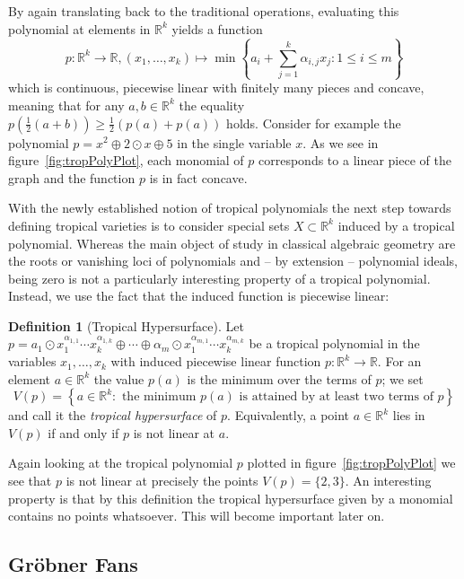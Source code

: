 \documentclass[
  paper=a4,
  DIV=14,
  fontsize=12pt,
  titlepage,
  bibliography=totoc,
  listof=totoc,
  pagesize=pdftex
]{scrartcl}
\numberwithin{figure}{section}
\numberwithin{equation}{section}
\numberwithin{table}{section}
\newcommand*\setR{\mathds{R}}
\theoremstyle{definition}
\newtheorem{definition}{Definition}
\numberwithin{definition}{section}
\begin{document}
By again translating back to the traditional operations, evaluating this polynomial at
elements in $\setR^k$ yields a function
\[
  p : \setR^k \to \setR, (x_1, \dots, x_k) \mapsto
  \min\left\{
    a_i + \sum_{j=1}^k \alpha_{i,j}x_j : 1 \leq i \leq m
  \right\}
\]
which is continuous, piecewise linear with finitely many pieces and concave, meaning that
for any $a,b \in \setR^k$ the equality $p(\frac12(a+b)) \geq \frac12(p(a)+p(a))$ holds.
Consider for example the polynomial $p = x^2 \oplus 2\odot x \oplus 5$ in the single
variable $x$. As we see in figure~\ref{fig:tropPolyPlot}, each monomial of $p$ corresponds
to a linear piece of the graph and the function $p$ is in fact concave.

With the newly established notion of tropical polynomials the next step towards defining
tropical varieties is to consider special sets $X \subset \setR^k$ induced by a tropical
polynomial. Whereas the main object of study in classical algebraic geometry are the
roots or vanishing loci of polynomials and -- by extension -- polynomial ideals, being
zero is not a particularly interesting property of a tropical polynomial. Instead, we use
the fact that the induced function is piecewise linear:

\begin{definition}[Tropical Hypersurface]
  Let $p = a_1 \odot x_1^{\alpha_{1,1}}\cdots x_k^{\alpha_{1,k}} \oplus \cdots \oplus
  \alpha_m \odot x_1^{\alpha_{m,1}}\cdots x_k^{\alpha_{m,k}}$ be a tropical polynomial in the
  variables $x_1, \dots, x_k$ with induced piecewise linear function $p:\setR^k \to
  \setR$. For an element $a\in \setR^k$ the value $p(a)$ is the minimum over the terms of
  $p$; we set
  \[
    V(p) = \left\{
      a \in \setR^k :
      \text{ the minimum $p(a)$ is attained by at least two terms of $p$}
    \right\}
  \]
  and call it the \emph{tropical hypersurface} of $p$. Equivalently, a point $a\in
  \setR^k$ lies in $V(p)$ if and only if $p$ is not linear at $a$.
  \label{def:tropHypersurface}
\end{definition}

Again looking at the tropical polynomial $p$ plotted in figure~\ref{fig:tropPolyPlot} we
see that $p$ is not linear at precisely the points $V(p) = \{ 2, 3 \}$. An interesting
property is that by this definition the tropical hypersurface given by a monomial contains
no points whatsoever. This will become important later on.

\subsection{Gröbner Fans}
\end{document}
